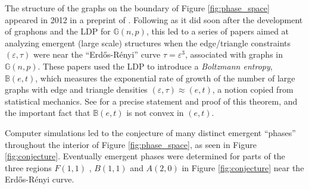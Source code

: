 \documentclass[12pt]{amsart}
\newcommand{\tdens}{\tau}
\newcommand{\edens}{\varepsilon}
\newcommand{\ER}{Erd\H{o}s-R\'enyi}
\newcommand{\G}{\mathbb{G}}
\newcommand{\B}{\mathbb{B}}
\begin{document}
The  structure of the graphs on the
boundary of Figure \ref{fig:phase_space} appeared in 2012  in a preprint of \cite{PR}.
Following as it did soon after the development of graphons and the LDP for $\G(n,p)$, this led to a series of papers aimed at analyzing emergent (large scale) structures when the edge/triangle constraints $(\edens,\tdens)$  were near the ``\ER{}'' curve $\tdens=\edens^3$, associated with graphs in $\G(n,p)$. 
These papers used the LDP to introduce a {\em Boltzmann entropy}, $\B(e, t)$, which measures the exponential rate of growth of the
number of large graphs with edge and triangle densities $(\edens, \tdens) \approx (e, t)$, a notion copied from statistical mechanics. See \cite{RS2} for a precise statement and proof of this theorem, and the important fact that $\B(e,t)$ is not convex in $(e,t)$.

Computer simulations led to the conjecture \cite{KRRS1} of many distinct emergent ``phases'' throughout the interior of Figure \ref{fig:phase_space}, as seen in Figure \ref{fig:conjecture}. Eventually emergent phases were determined for parts of the three regions $F(1,1)$ \cite{KRRS2}, $B(1,1)$ \cite{NRS3} and $A(2,0)$ \cite{NRS4} in Figure \ref{fig:conjecture} near the \ER{} curve.
\end{document}
